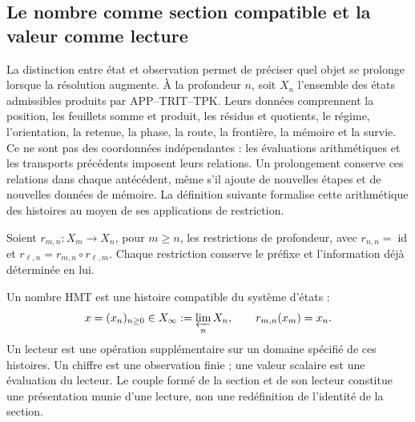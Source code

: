 
\subsection{Le nombre comme section compatible et la valeur comme lecture}
\label{hist:seccion}

La distinction entre état et observation permet de préciser quel objet se
prolonge lorsque la résolution augmente. À la profondeur \(n\), soit \(X_n\)
l’ensemble des états admissibles produits par APP--TRIT--TPK. Leurs données
comprennent la position, les feuillets somme et produit, les résidus et quotients, le régime,
l’orientation, la retenue, la phase, la route, la frontière, la mémoire et la survie. Ce ne sont pas
des coordonnées indépendantes : les évaluations arithmétiques et les transports
précédents imposent leurs relations. Un prolongement conserve ces relations
dans chaque antécédent, même s’il ajoute de nouvelles étapes et de nouvelles données de mémoire.
La définition suivante formalise cette arithmétique des histoires au moyen
de ses applications de restriction.

Soient \(r_{m,n}:X_m\to X_n\), pour \(m\geq n\), les restrictions de
profondeur, avec \(r_{n,n}=\operatorname{id}\) et
\(r_{\ell,n}=r_{m,n}\circ r_{\ell,m}\). Chaque restriction conserve le
préfixe et l’information déjà déterminée en lui.

\begin{definition}
Un nombre HMT est une histoire compatible du système d’états :
\begin{equation}
 x=(x_n)_{n\geq0}\in X_\infty:=\varprojlim_n X_n,
 \qquad r_{m,n}(x_m)=x_n.
 \label{hist:limite-inverso}
\end{equation}
Un lecteur est une opération supplémentaire sur un domaine spécifié de ces
histoires. Un chiffre est une observation finie ; une valeur scalaire est une
évaluation du lecteur. Le couple formé de la section et de son lecteur constitue
une présentation munie d’une lecture, non une redéfinition de l’identité de la section.
\end{definition}

